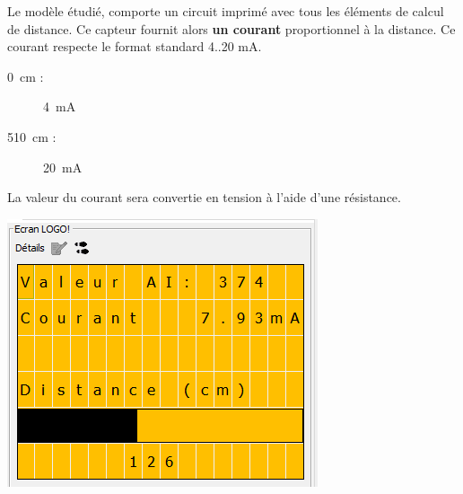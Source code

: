 \documentclass[11pt]{article}
\begin{document}
Le modèle étudié, comporte un circuit imprimé avec tous les éléments de calcul de distance.
Ce capteur fournit alors \textbf{un courant} proportionnel à la distance. Ce courant respecte le
format standard 4..20 mA.

\begin{description}
	\item[\SI{0}{cm} : ] \SI{4}{mA}
	\item[\SI{510}{cm} : ] \SI{20}{mA}
\end{description}

\begin{UPSTIactivite}
	La valeur du courant sera convertie en tension à l'aide d'une résistance. 
	\begin{center}
		\includegraphics[height=.15\textheight]{images/TP04-attenduUltrason.png}
	\end{center}
	
\end{UPSTIactivite}
\end{document}
